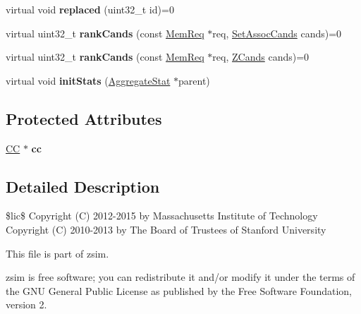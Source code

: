 \begin{DoxyCompactItemize}
\item 
\hypertarget{classReplPolicy_a52cd8ad55c43817d5f48e819f47ddc7a}{virtual void {\bfseries replaced} (uint32\-\_\-t id)=0}\label{classReplPolicy_a52cd8ad55c43817d5f48e819f47ddc7a}

\item 
\hypertarget{classReplPolicy_af630792de319f21796dd4348d69611e2}{virtual uint32\-\_\-t {\bfseries rank\-Cands} (const \hyperlink{structMemReq}{Mem\-Req} $\ast$req, \hyperlink{structSetAssocCands}{Set\-Assoc\-Cands} cands)=0}\label{classReplPolicy_af630792de319f21796dd4348d69611e2}

\item 
\hypertarget{classReplPolicy_a7ddfe77082cf23c6d7fdc8dae67ab8c0}{virtual uint32\-\_\-t {\bfseries rank\-Cands} (const \hyperlink{structMemReq}{Mem\-Req} $\ast$req, \hyperlink{structZCands}{Z\-Cands} cands)=0}\label{classReplPolicy_a7ddfe77082cf23c6d7fdc8dae67ab8c0}

\item 
\hypertarget{classReplPolicy_a4a7eff9648fcd8ce037fa16da5752810}{virtual void {\bfseries init\-Stats} (\hyperlink{classAggregateStat}{Aggregate\-Stat} $\ast$parent)}\label{classReplPolicy_a4a7eff9648fcd8ce037fa16da5752810}

\end{DoxyCompactItemize}
\subsection*{Protected Attributes}
\begin{DoxyCompactItemize}
\item 
\hypertarget{classReplPolicy_a04d2f2d1a9dfffe90a58c144165d146a}{\hyperlink{classCC}{C\-C} $\ast$ {\bfseries cc}}\label{classReplPolicy_a04d2f2d1a9dfffe90a58c144165d146a}

\end{DoxyCompactItemize}


\subsection{Detailed Description}
\$lic\$ Copyright (C) 2012-\/2015 by Massachusetts Institute of Technology Copyright (C) 2010-\/2013 by The Board of Trustees of Stanford University

This file is part of zsim.

zsim is free software; you can redistribute it and/or modify it under the terms of the G\-N\-U General Public License as published by the Free Software Foundation, version 2.

